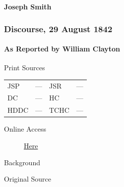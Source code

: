 				\begin{tightright}
					\textbf{Joseph Smith}
				\end{tightright}
				
		\subsubsection{Discourse, 29 August 1842}
			\label{EMS-1842-JS-29-AUG-1842}
			
			\paragraph{As Reported by William Clayton}
				\label{EMS-1842-JS-29-AUG-1842-WC}
			
				\begin{description}
					\item[Print Sources]
				\end{description}

				\begin{tabular}{p{0.5in}p{1in}p{0.5in}p{1in}}
					JSP	 	& ---		& JSR 		& --- \\
					DC	 	& ---		& HC 		& --- \\
					HDDC 	& ---		& TCHC 		& --- \\
				\end{tabular}
				
				\begin{description}
					\item[Online Access] \href{https://www.josephsmithpapers.org/paper-summary/discourse-29-august-1842-as-reported-by-william-clayton/1}{Here}
				\end{description}
				
				\begin{description}
					\item[Background]
				\end{description}
				
				
				\begin{description}
					\item[Original Source]
				\end{description}
				
